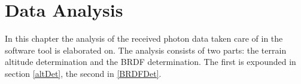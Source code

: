 \chapter{Data Analysis}
\label{dataAnalysis}
In this chapter the analysis of the received photon data taken care of in the software tool is elaborated on. The analysis consists of two parts: the terrain altitude determination and the \ac{BRDF} determination. The first is expounded in section \ref{altDet}, the second in \ref{BRDFDet}.
